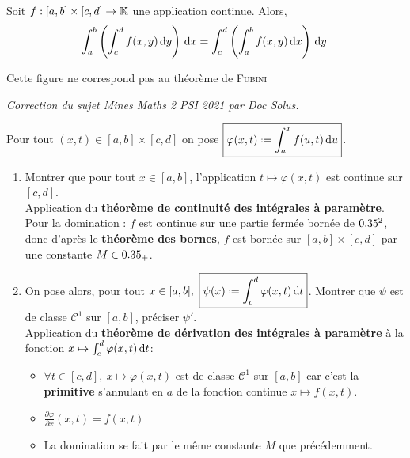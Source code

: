 
\begin{theo}{}
    Soit $f: [a,b] \times [c, d] \to \mathbb{K}$ une application continue. Alors,
    $$\int_{a}^{b} \left ( \int_{c}^{d} f(x,y) \, \mathrm{d} y \right) \, \mathrm{d} x = \int_{c}^{d} \left ( \int_{a}^{b} f(x,y) \, \mathrm{d} x \right) \, \mathrm{d} y.$$
\end{theo}

\begin{marginfigure}[5cm]
    \centering
    
    \caption*{\centering Cette figure ne correspond pas au théorème de \textsc{Fubini}}
\end{marginfigure}

\textit{Correction du sujet Mines Maths 2 PSI 2021 par Doc Solus.} 
\begin{preuve}
    Pour tout $(x, t) \in [a, b] \times [c, d]$ on pose $\boxed{\varphi(x, t) \defeq \int_{a}^{x} f(u, t) \d u}$. 
    \begin{enumerate}
        \item Montrer que pour tout $x \in [a, b]$, l'application $t \mapsto \varphi(x, t)$ est continue sur $[c, d]$. \\
        Application du \textbf{théorème de continuité des intégrales à paramètre}. \\
        Pour la domination : $f$ est continue sur une partie fermée bornée de $0.35^2$, donc d'après le \textbf{théorème des bornes}, $f$ est bornée sur $[a, b] \times [c, d]$ par une constante $M \in 0.35_+$.
        \item On pose alors, pour tout $x  \in [a, b],\ \boxed{\psi(x) \defeq \int_{c}^{d} \varphi(x, t) \d t}$. Montrer que $\psi$ est de classe $\mathscr{C}^1$ sur $[a, b]$, préciser $\psi'$. \\
        Application du \textbf{théorème de dérivation des intégrales à paramètre} à la fonction $x \mapsto \int_{c}^{d} \varphi(x, t) \, \mathrm{d} t$:
        \begin{itemize}
            \item $\forall t \in [c, d],\ x \mapsto \varphi(x, t)$ est de classe $\mathscr{C}^1$ sur $[a, b]$ car c'est la \textbf{primitive} s'annulant en $a$ de la fonction continue $x \mapsto f(x, t)$. 
            \item $\frac{\partial \varphi}{\partial x}(x, t) = f(x, t)$
            \item La domination se fait par le même constante $M$ que précédemment. 
        \end{itemize}

\end{enumerate}
\end{preuve}
